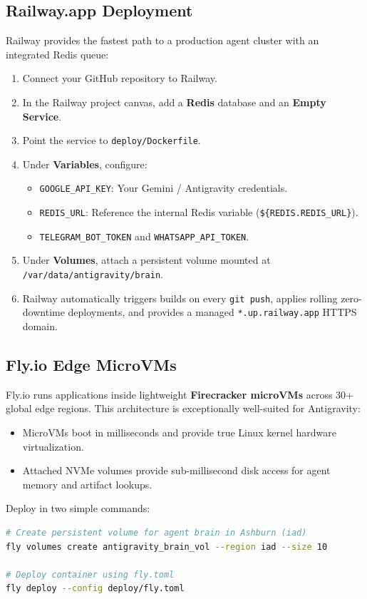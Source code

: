 \documentclass[11pt,a4paper,oneside]{book}
\begin{document}
\subsection{Railway.app Deployment}
Railway provides the fastest path to a production agent cluster with an integrated Redis queue:
\begin{enumerate}
    \item Connect your GitHub repository to Railway.
    \item In the Railway project canvas, add a \textbf{Redis} database and an \textbf{Empty Service}.
    \item Point the service to \texttt{deploy/Dockerfile}.
    \item Under \textbf{Variables}, configure:
    \begin{itemize}
        \item \texttt{GOOGLE\_API\_KEY}: Your Gemini / Antigravity credentials.
        \item \texttt{REDIS\_URL}: Reference the internal Redis variable (\texttt{\$\{REDIS.REDIS\_URL\}}).
        \item \texttt{TELEGRAM\_BOT\_TOKEN} and \texttt{WHATSAPP\_API\_TOKEN}.
    \end{itemize}
    \item Under \textbf{Volumes}, attach a persistent volume mounted at \texttt{/var/data/antigravity/brain}.
    \item Railway automatically triggers builds on every \texttt{git push}, applies rolling zero-downtime deployments, and provides a managed \texttt{*.up.railway.app} HTTPS domain.
\end{enumerate}

\subsection{Fly.io Edge MicroVMs}
Fly.io runs applications inside lightweight \textbf{Firecracker microVMs} across 30+ global edge regions. This architecture is exceptionally well-suited for Antigravity:
\begin{itemize}
    \item MicroVMs boot in milliseconds and provide true Linux kernel hardware virtualization.
    \item Attached NVMe volumes provide sub-millisecond disk access for agent memory and artifact lookups.
\end{itemize}

Deploy in two simple commands:
\begin{lstlisting}[language=bash]
# Create persistent volume for agent brain in Ashburn (iad)
fly volumes create antigravity_brain_vol --region iad --size 10

# Deploy container using fly.toml
fly deploy --config deploy/fly.toml
\end{lstlisting}
\end{document}
